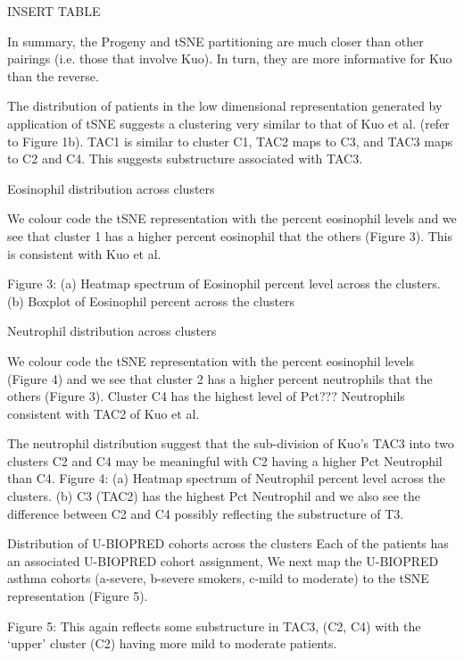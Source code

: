 \documentclass[9pt,twocolumn,twoside]{pnas-new}
\begin{document}
INSERT TABLE

In summary, the  Progeny and tSNE partitioning are much closer than other pairings (i.e. those that involve Kuo). In turn, they are more informative for Kuo than the reverse.

The distribution of patients in the low dimensional representation generated by application of tSNE suggests a clustering very similar to that of Kuo et al. (refer to Figure 1b). TAC1 is similar to cluster C1, TAC2 maps to C3, and TAC3 maps to C2 and C4. This suggests substructure associated with TAC3. 

Eosinophil distribution across clusters 

We colour code the tSNE representation with the percent eosinophil levels and we see that cluster 1 has a higher percent eosinophil that the others (Figure 3). This is consistent with Kuo et al.

Figure 3: (a) Heatmap spectrum of Eosinophil percent level across the clusters. (b) Boxplot of Eosinophil percent across the clusters 

Neutrophil distribution across clusters  

We colour code the tSNE representation with the percent eosinophil levels (Figure 4) and we see that cluster 2 has a higher percent neutrophils that the others (Figure 3). Cluster C4 has the highest level of Pct??? Neutrophils consistent with TAC2 of Kuo et al. 

The neutrophil distribution suggest that the sub-division of Kuo’s TAC3 into two clusters C2 and C4 may be meaningful with C2 having a higher Pct Neutrophil than C4.
% 
% 
Figure 4: (a) Heatmap spectrum of Neutrophil percent level across the clusters. (b) C3 (TAC2) has the highest Pct Neutrophil and we also see the difference between C2 and C4 possibly reflecting the substructure of T3. 

Distribution of U-BIOPRED cohorts across the clusters 
Each of the patients has an associated U-BIOPRED cohort assignment, We next map the U-BIOPRED asthma cohorts (a-severe, b-severe smokers, c-mild to moderate) to the tSNE representation (Figure 5). 

Figure 5: This again reflects some substructure in TAC3, (C2, C4) with the ‘upper’ cluster (C2) having more mild to moderate patients. 
\end{document}
